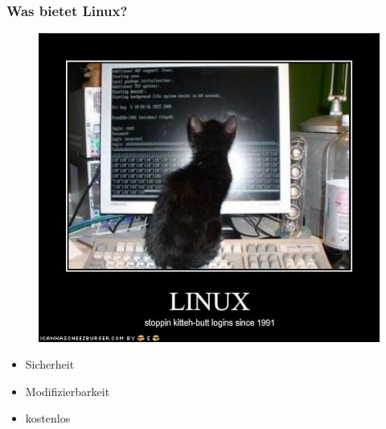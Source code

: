 \documentclass{beamer}
\begin{document}
\begin{frame}
\frametitle{Was bietet Linux?}
\begin{figure}
\includegraphics[scale=0.35]{resources/kitteh.jpg}
\end{figure}
\begin{itemize}
	\item Sicherheit
	\item Modifizierbarkeit
	\item kostenlos
\end{itemize}
\end{frame}
\end{document}
